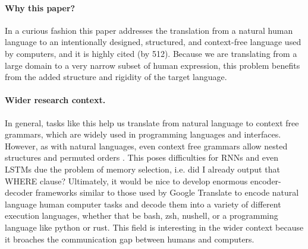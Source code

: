 \paragraph{Why this paper?}
In a curious fashion this paper addresses the translation from a natural human language to an intentionally designed, structured, and context-free language used by computers, and it is highly cited (by 512). Because we are translating from a large domain to a very narrow subset of human expression, this problem benefits from the added structure and rigidity of the target language.

\paragraph{Wider research context.}
 In general, tasks like this help us translate from natural language to context free grammars, which are widely used in programming languages and interfaces. However, as with natural languages, even context free grammars allow nested structures and permuted orders \cite{zeng2020recparser, allamanis2018survey}. This poses difficulties for RNNs and even LSTMs due the problem of memory selection, i.e. did I already output that WHERE clause? Ultimately, it would be nice to develop enormous encoder-decoder frameworks similar to those used by Google Translate to encode natural language human computer tasks and decode them into a variety of different execution languages, whether that be bash, zsh, nushell, or a programming language like python or rust. This field is interesting in the wider context because it broaches the communication gap between humans and computers.